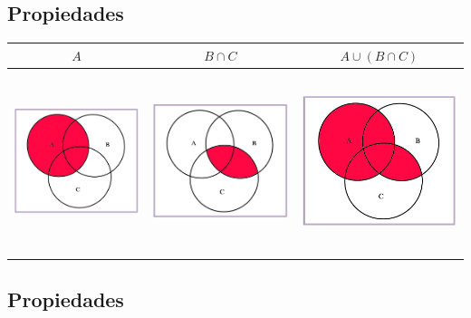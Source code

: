 \documentclass[]{book}
\begin{document}
\hypertarget{propiedades-1}{%
\subsection{Propiedades}\label{propiedades-1}}

\begin{longtable}[]{@{}ccc@{}}
\toprule
\(A\) & \(B\cap C\) & \(A\cup (B\cap C)\)\tabularnewline
\midrule
\endhead
\includegraphics[width=\textwidth,height=2.08333in]{Images/proba1dibujos/distr11.jpg} & \includegraphics[width=\textwidth,height=2.08333in]{Images/proba1dibujos/distr12.jpg} & \includegraphics[width=\textwidth,height=2.08333in]{Images/proba1dibujos/distr13.jpg}\tabularnewline
\bottomrule
\end{longtable}

\hypertarget{propiedades-2}{%
\subsection{Propiedades}\label{propiedades-2}}
\end{document}
